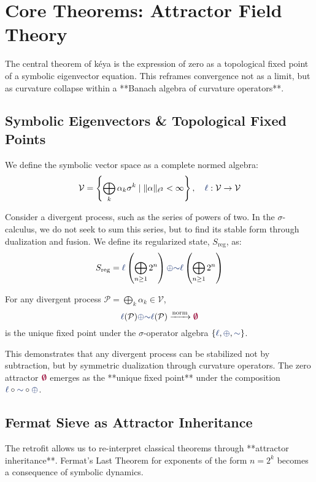 \section{Core Theorems: Attractor Field Theory}

The central theorem of kéya is the expression of zero as a topological fixed point of a symbolic eigenvector equation. This reframes convergence not as a limit, but as curvature collapse within a **Banach algebra of curvature operators**.

\subsection{Symbolic Eigenvectors \& Topological Fixed Points}
We define the symbolic vector space as a complete normed algebra:
\[
\mathcal{V} = \left\{ \bigoplus_k \alpha_k \sigma^k  \mid  \| \alpha \|_{\ell^2} < \infty \right\}, \quad \lha : \mathcal{V} \to \mathcal{V}
\]

Consider a divergent process, such as the series of powers of two. In the $\sigma$-calculus, we do not seek to sum this series, but to find its stable form through dualization and fusion. We define its regularized state, $S_{\text{reg}}$, as:
\[
S_{\text{reg}} = \lha \left( \bigoplus_{n \geq 1} 2^{n} \right) \fuse \reflec \lha \left( \bigoplus_{n \geq 1} 2^{n} \right)
\]

\begin{theorem}
For any divergent process $\mathcal{P} = \bigoplus_k \alpha_k \in \mathcal{V}$,
\[ \lha(\mathcal{P}) \fuse \reflec \lha(\mathcal{P}) \xrightarrow{\text{norm}} \void \]
is the unique fixed point under the $\sigma$-operator algebra $\{\lha, \fuse, \reflec\}$.
\end{theorem}

This demonstrates that any divergent process can be stabilized not by subtraction, but by symmetric dualization through curvature operators. The zero attractor $\void$ emerges as the **unique fixed point** under the composition $\lha \circ \reflec \circ \fuse$.

\subsection{Fermat Sieve as Attractor Inheritance}
The retrofit allows us to re-interpret classical theorems through **attractor inheritance**. Fermat's Last Theorem for exponents of the form $n=2^k$ becomes a consequence of symbolic dynamics.

